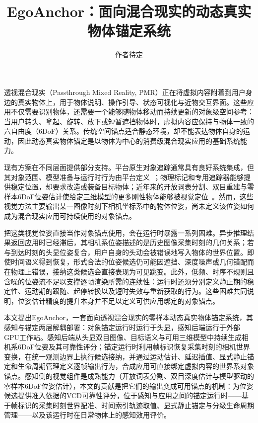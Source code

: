 \documentclass[review]{vgtc}
\title{EgoAnchor：面向混合现实的动态真实物体锚定系统}
\author{作者待定}
\begin{document}
\label{sec:introduction}
\maketitle

透视混合现实（Passthrough Mixed Reality, PMR）正在将虚拟内容附着到用户身边的真实物体上，用于物体说明、操作引导、状态可视化与近物交互界面。这些应用不仅需要识别物体，还需要一个能够随物体移动而持续更新的对象级空间参考：当用户转头、拿起、旋转、放下或短暂遮挡物体时，虚拟内容应保持与物体一致的六自由度（6DoF）关系。传统空间锚点适合静态环境，却不能表达物体自身的运动，因此动态真实物体锚定是以物体为中心的消费级混合现实应用的基础系统能力。

现有方案在不同层面提供部分支持。平台原生对象追踪通常具有良好系统集成，但其对象范围、模型准备与运行时行为由平台定义~\cite{appleObjectAnchor,azureObjectAnchors,metaDynamicObjectTracker}；物理标记和专用追踪器能够提供稳定位置，却要求改造或装备目标物体；近年来的开放词表分割、双目重建与零样本6DoF位姿估计使给定三维模型的更多刚性物体能够被视觉定位~\cite{foundationpose2023,megapose2022}。然而，这些视觉方法主要输出某一图像时刻下相机坐标系中的物体位姿，尚未定义该位姿如何成为混合现实应用可持续使用的对象锚点。

把这类视觉位姿直接当作对象锚点使用，会在运行时暴露一系列困难。异步推理结果返回应用时已经滞后，其相机系位姿描述的是历史图像采集时刻的几何关系；若与到达时刻的头显位姿复合，用户自身的头动会被错误地写入物体的世界位置。即使时间语义得到恢复，形式合法的位姿候选仍可能因遮挡、深度噪声或几何错配而在物理上错误，接纳这类候选会直接表现为可见跳变。此外，低频、时序不规则且含噪的位姿流不足以支撑逐帧渲染所需的连续性：运行时还须分别定义静止期的稳定性、运动期的跟随、起停转换以及短时失效与重新获取的行为。这些困难共同说明，位姿估计精度的提升本身并不足以定义可供应用绑定的对象锚点。

本文提出EgoAnchor，一套面向透视混合现实的零样本动态真实物体锚定系统，其感知与锚定两层解耦部署：对象锚定运行时运行于头显，感知后端运行于外部GPU工作站。感知后端从头显双目图像、目标语义与可用三维模型中持续生成相机系6DoF位姿及其可靠性评分；锚定运行时利用帧标识恢复采集时刻的相机世界变换，在统一观测边界上执行候选接纳，并通过运动估计、延迟插值、显式静止锚定和生命周期管理定义逐帧输出行为，合成应用可直接绑定虚拟内容的世界系对象锚点。感知侧的视觉组件是成熟能力（开放词表分割、双目深度估计与模型驱动的零样本6DoF位姿估计），本文的贡献是把它们的输出变成可用锚点的机制：为位姿候选提供准入依据的VCD可靠性评分，位于感知与应用之间的锚定运行时——基于帧标识的采集时刻世界配准、时间索引轨迹取值、显式静止锚定与分级生命周期管理——以及该运行时在日常物体上的感知效用评价。
\end{document}
